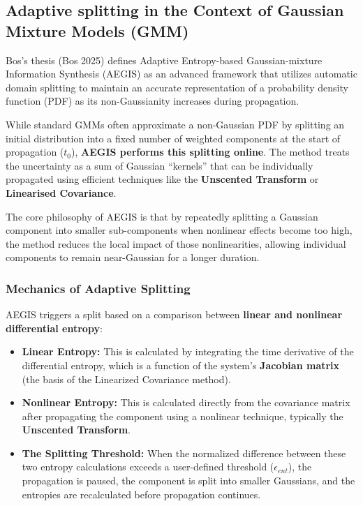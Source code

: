 \documentclass[
  letterpaper,
  DIV=11,
  numbers=noendperiod,
  oneside]{scrartcl}
\begin{document}
\subsection{Adaptive splitting in the Context of Gaussian Mixture Models
(GMM)}\label{adaptive-splitting-in-the-context-of-gaussian-mixture-models-gmm}

Bos's thesis (Bos 2025) defines Adaptive Entropy-based Gaussian-mixture
Information Synthesis (AEGIS) as an advanced framework that utilizes
automatic domain splitting to maintain an accurate representation of a
probability density function (PDF) as its non-Gaussianity increases
during propagation.

While standard GMMs often approximate a non-Gaussian PDF by splitting an
initial distribution into a fixed number of weighted components at the
start of propagation (\(t_0\)), \textbf{AEGIS performs this splitting
online}. The method treats the uncertainty as a sum of Gaussian
``kernels'' that can be individually propagated using efficient
techniques like the \textbf{Unscented Transform} or \textbf{Linearised
Covariance}.

The core philosophy of AEGIS is that by repeatedly splitting a Gaussian
component into smaller sub-components when nonlinear effects become too
high, the method reduces the local impact of those nonlinearities,
allowing individual components to remain near-Gaussian for a longer
duration.

\subsubsection{Mechanics of Adaptive
Splitting}\label{mechanics-of-adaptive-splitting}

AEGIS triggers a split based on a comparison between \textbf{linear and
nonlinear differential entropy}:

\begin{itemize}
\item
  \textbf{Linear Entropy:} This is calculated by integrating the time
  derivative of the differential entropy, which is a function of the
  system's \textbf{Jacobian matrix} (the basis of the Linearized
  Covariance method).
\item
  \textbf{Nonlinear Entropy:} This is calculated directly from the
  covariance matrix after propagating the component using a nonlinear
  technique, typically the \textbf{Unscented Transform}.
\item
  \textbf{The Splitting Threshold:} When the normalized difference
  between these two entropy calculations exceeds a user-defined
  threshold (\(\epsilon_{ent}\)), the propagation is paused, the
  component is split into smaller Gaussians, and the entropies are
  recalculated before propagation continues.
\end{itemize}
\end{document}
